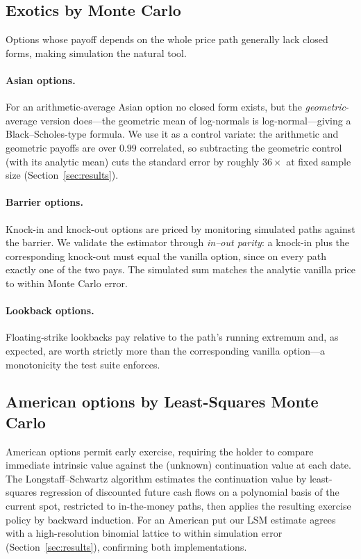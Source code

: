 \documentclass[11pt]{article}
\begin{document}
\subsection{Exotics by Monte Carlo}
Options whose payoff depends on the whole price path generally lack closed forms,
making simulation the natural tool.

\paragraph{Asian options.} For an arithmetic-average Asian option no closed form
exists, but the \emph{geometric}-average version does---the geometric mean of
log-normals is log-normal---giving a Black--Scholes-type formula. We use it as a
control variate: the arithmetic and geometric payoffs are over $0.99$ correlated,
so subtracting the geometric control (with its analytic mean) cuts the standard
error by roughly $36\times$ at fixed sample size (Section~\ref{sec:results}).

\paragraph{Barrier options.} Knock-in and knock-out options are priced by
monitoring simulated paths against the barrier. We validate the estimator through
\emph{in--out parity}: a knock-in plus the corresponding knock-out must equal the
vanilla option, since on every path exactly one of the two pays. The simulated
sum matches the analytic vanilla price to within Monte Carlo error.

\paragraph{Lookback options.} Floating-strike lookbacks pay relative to the
path's running extremum and, as expected, are worth strictly more than the
corresponding vanilla option---a monotonicity the test suite enforces.

\subsection{American options by Least-Squares Monte Carlo}
American options permit early exercise, requiring the holder to compare immediate
intrinsic value against the (unknown) continuation value at each date. The
Longstaff--Schwartz algorithm \citep{longstaff2001} estimates the continuation
value by least-squares regression of discounted future cash flows on a polynomial
basis of the current spot, restricted to in-the-money paths, then applies the
resulting exercise policy by backward induction. For an American put our LSM
estimate agrees with a high-resolution binomial lattice to within simulation
error (Section~\ref{sec:results}), confirming both implementations.
\end{document}
